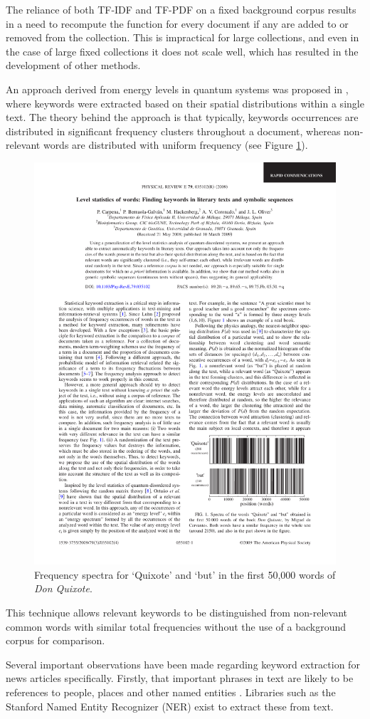 The reliance of both TF-IDF and TF-PDF on a fixed background corpus results in a need to recompute the function for every document if any are added to or removed from the collection. This is impractical for large collections, and even in the case of large fixed collections it does not scale well, which has resulted in the development of other methods.

An approach derived from energy levels in quantum systems was proposed in \cite{LevelStatisticsOfWords}, where keywords were extracted based on their spatial distributions within a single text. The theory behind the approach is that typically, keywords occurrences are distributed in significant frequency clusters throughout a document, whereas non-relevant words are distributed with uniform frequency (see Figure \ref{fig:ols-spectra}).

\begin{figure}[htbp!]
	\centering
	\includegraphics[width=.6\textwidth]{img/lit-survey/ols-keyword-spectra.pdf}
	\caption{Frequency spectra for `Quixote' and `but' in the first 50,000 words of \textit{Don Quixote}. \citep{LevelStatisticsOfWords}}
	\label{fig:ols-spectra}
\end{figure}

This technique allows relevant keywords to be distinguished from non-relevant common words with similar total frequencies without the use of a background corpus for comparison.

Several important observations have been made regarding keyword extraction for news articles specifically. Firstly, that important phrases in text are likely to be references to people, places and other named entities \citep{NewsStand}. Libraries such as the Stanford Named Entity Recognizer (NER) \citep{NestedNamedEntityRecognition} exist to extract these from text. 

